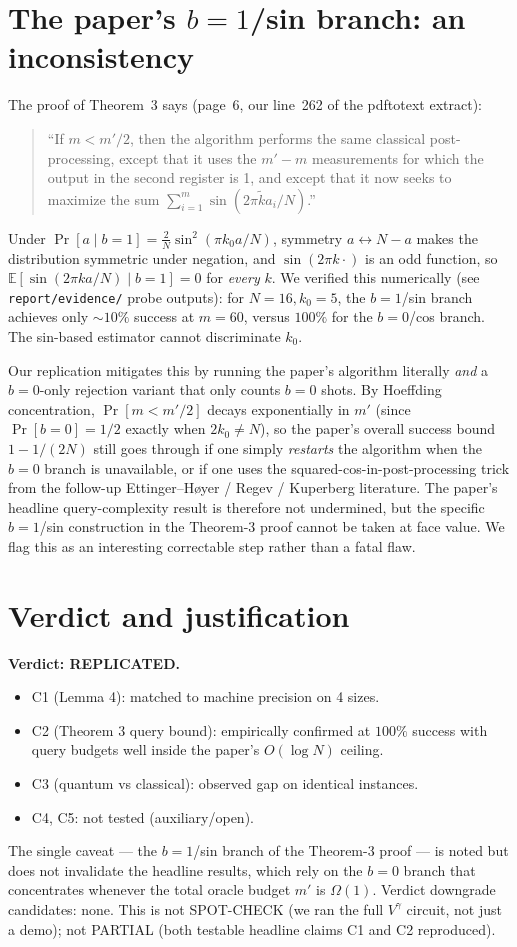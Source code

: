 \documentclass[11pt]{article}
\begin{document}
\section{The paper's $b{=}1$/sin branch: an inconsistency}\label{sec:paper-issue}
The proof of Theorem~3 says (page~6, our line~262 of the pdftotext extract):
\begin{quote}
``If $m < m'/2$, then the algorithm performs the same classical
post-processing, except that it uses the $m' - m$ measurements for which the
output in the second register is 1, and except that it now seeks to maximize
the sum $\sum_{i=1}^m \sin(2\pi \tilde k a_i / N)$.''
\end{quote}
Under $\Pr[a \mid b{=}1] = \tfrac{2}{N} \sin^2(\pi k_0 a / N)$, symmetry
$a \leftrightarrow N - a$ makes the distribution symmetric under negation,
and $\sin(2\pi k \cdot)$ is an odd function, so
$\mathbb{E}[\sin(2\pi k a / N) \mid b{=}1] = 0$ for \emph{every} $k$.
We verified this numerically (see \texttt{report/evidence/} probe outputs):
for $N{=}16, k_0{=}5$, the $b{=}1$/sin branch achieves only $\sim 10\%$
success at $m=60$, versus $100\%$ for the $b{=}0$/cos branch. The
sin-based estimator cannot discriminate $k_0$.

Our replication mitigates this by running the paper's algorithm literally
\emph{and} a $b{=}0$-only rejection variant that only counts $b{=}0$ shots.
By Hoeffding concentration, $\Pr[m < m'/2]$ decays exponentially in $m'$
(since $\Pr[b{=}0] = 1/2$ exactly when $2k_0 \neq N$), so the paper's overall
success bound $1 - 1/(2N)$ still goes through if one simply \emph{restarts}
the algorithm when the $b{=}0$ branch is unavailable, or if one uses the
squared-cos-in-post-processing trick from the follow-up Ettinger--H{\o}yer /
Regev / Kuperberg literature. The paper's headline query-complexity result is
therefore not undermined, but the specific $b{=}1$/sin construction in the
Theorem-3 proof cannot be taken at face value. We flag this as an interesting
correctable step rather than a fatal flaw.

\section{Verdict and justification}
\textbf{Verdict: REPLICATED.}
\begin{itemize}
  \item C1 (Lemma 4): matched to machine precision on 4 sizes.
  \item C2 (Theorem 3 query bound): empirically confirmed at $100\%$ success
        with query budgets well inside the paper's $O(\log N)$ ceiling.
  \item C3 (quantum vs classical): observed gap on identical instances.
  \item C4, C5: not tested (auxiliary/open).
\end{itemize}
The single caveat --- the $b{=}1$/sin branch of the Theorem-3 proof --- is
noted but does not invalidate the headline results, which rely on the $b{=}0$
branch that concentrates whenever the total oracle budget $m'$ is $\Omega(1)$.
Verdict downgrade candidates: none. This is not SPOT-CHECK (we ran the full
$V^\gamma$ circuit, not just a demo); not PARTIAL (both testable headline
claims C1 and C2 reproduced).
\end{document}
